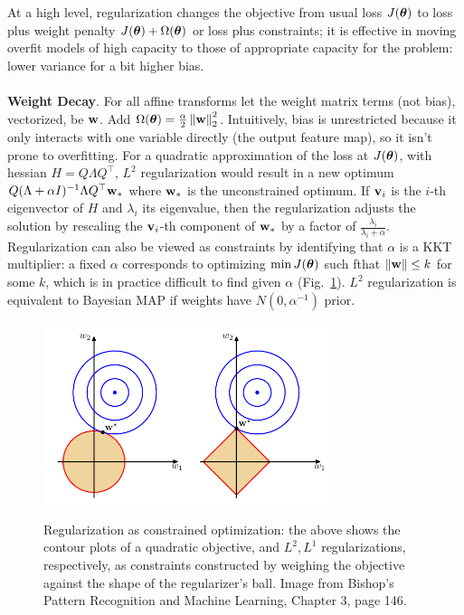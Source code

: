 \documentclass{article}
\begin{document}
At a high level, regularization changes the objective from usual loss $J({\boldsymbol\theta})$ to loss plus weight penalty $J({\boldsymbol\theta})+\Omega({\boldsymbol\theta})$ or loss plus constraints; it is effective in moving overfit models of high capacity to those of appropriate capacity for the problem: lower variance for a bit higher bias.
\\\\
\noindent
\textbf{Weight Decay}. For all affine transforms let the weight matrix terms (not bias), vectorized, be $\textbf{w}$. Add $\Omega({\boldsymbol\theta})=\frac{\alpha}{2}\left\| \textbf{w} \right\|_2^2$. Intuitively, bias is unrestricted because it only interacts with one variable directly (the output feature map), so it isn't prone to overfitting. For a quadratic approximation of the loss at $J({\boldsymbol\theta})$, with hessian $H=Q\Lambda Q^\top$, $L^2$ regularization would result in a new optimum $Q(\Lambda+\alpha I)^{-1}\Lambda Q^\top \textbf{w}_*$ where $\textbf{w}_*$ is the unconstrained optimum. If $\textbf{v}_i$ is the $i$-th eigenvector of $H$ and $\lambda_i$ its eigenvalue, then the regularization adjusts the solution by rescaling the $\textbf{v}_i$-th component of $\textbf{w}_*$ by a factor of $\frac{\lambda_i}{\lambda_i+\alpha}$. Regularization can also be viewed as constraints by identifying that $\alpha$ is a KKT multiplier: a fixed $\alpha$ corresponds to optimizing $\min J({\boldsymbol\theta})$ such fthat $\left\| \textbf{w} \right\|\le k$ for some $k$, which is in practice difficult to find given $\alpha$ (Fig.~\ref{fig:reg}). $L^2$ regularization is equivalent to Bayesian MAP if weights have $N(0,\alpha^{-1})$ prior.
\begin{figure}[!h]
\centering
{\includegraphics[width=0.75\textwidth]{reg.pdf}}
  \caption{Regularization as constrained optimization: the above shows the contour plots of a quadratic objective, and $L^2,L^1$ regularizations, respectively, as constraints constructed by weighing the objective against the shape of the regularizer's ball. Image from Bishop's Pattern Recognition and Machine Learning, Chapter 3, page 146.}
\label{fig:reg}
\end{figure}
\end{document}

